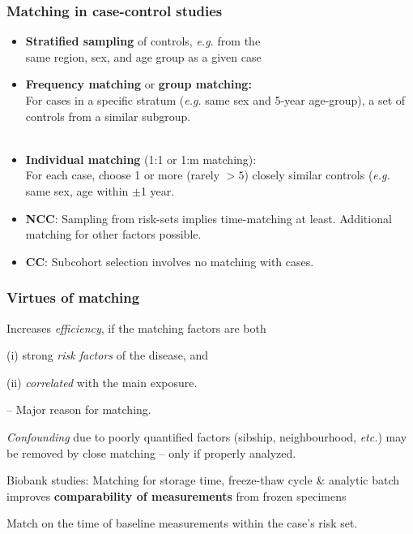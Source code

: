 \documentclass[12pt,dvipsnames,t,handout%
,aspectratio=169%
]{beamer}
\begin{document}

\begin{frame}
\frametitle{Matching in case-control studies}
\pause
\begin{itemize}
\item[=] {\bf Stratified sampling} of controls,  {\it e.g.} from 
the \\ same region, sex, and age group as a given case 
\pause\medskip
   \item {\bf Frequency matching} or {\bf group matching:} \\
  For cases in a specific stratum 
  ({\it e.g.} same sex and 5-year age-group), %
a set of controls from a similar subgroup. %
\\ { } \\
		\pause 
		  \medskip		
\item {\bf Individual matching} (1:1 or 1:m matching):\\
		For each case, choose 1 or more (rarely $>5$) closely similar
		controls (\textit{e.g.} same sex, age within $\pm$1 year. 
		\pause
	\medskip
\item
{\bf NCC}: Sampling from risk-sets 
implies time-matching at least.
Additional matching for other factors possible. 
\pause
	\medskip
\item
{\bf CC}: Subcohort selection involves no matching with cases.	
		\end{itemize}
\end{frame}
\begin{frame}
\frametitle{Virtues of matching}
\pause
\begin{itemize}
 \item Increases {\it efficiency}, 
 if the matching factors are both
 \bi
 {\normalsize
 \item[ ]
   (i) strong
	 \textit{risk factors} of the disease, and 
\item[ ](ii) 
	 \textit{correlated} with the main exposure. 
}
\ei	 
\pause
	-- Major reason for matching.  
	\pause   
\medskip   
\item \textit{Confounding} due to poorly
quantified factors (sibship, 
   neighbourhood, {\it etc.}) may be removed by close matching  
  -- only if properly analyzed. 
	\pause\medskip
\item Biobank studies: Matching
  for storage time, %
  freeze-thaw cycle \& analytic batch improves \textbf{comparability of measurements}
	from frozen specimens 
\bi
\item[$\to$] 
{\normalsize
  Match on the time of baseline measurements within the case's risk set.
  }
\ei   
\end{itemize}

\end{frame} 
\end{document}
